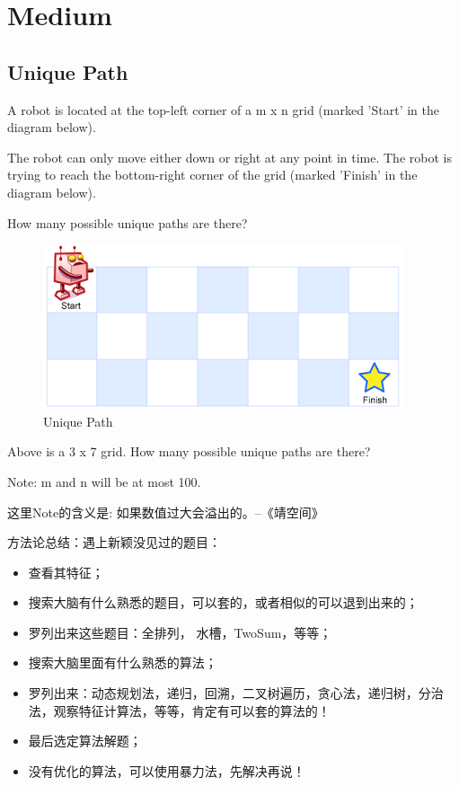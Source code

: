 \documentclass[12pt]{book}
\begin{document}
\section{Medium}
\label{sec-14-2}
\subsection{Unique Path}
\label{sec-14-2-1}
A robot is located at the top-left corner of a m x n grid (marked 'Start' in the diagram below).

The robot can only move either down or right at any point in time. The robot is trying to reach the bottom-right corner of the grid (marked 'Finish' in the diagram below).

How many possible unique paths are there?
\begin{figure}[htb]
\centering
\includegraphics[width=.9\linewidth]{./pic/uniquePaths.png}
\caption{Unique Path}
\end{figure}

Above is a 3 x 7 grid. How many possible unique paths are there?

Note: m and n will be at most 100.

这里Note的含义是: 如果数值过大会溢出的。--《靖空间》

方法论总结：遇上新颖没见过的题目：
\begin{itemize}
\item 查看其特征；
\item 搜索大脑有什么熟悉的题目，可以套的，或者相似的可以退到出来的；
\item 罗列出来这些题目：全排列， 水槽，TwoSum，等等；
\item 搜索大脑里面有什么熟悉的算法；
\item 罗列出来：动态规划法，递归，回溯，二叉树遍历，贪心法，递归树，分治法，观察特征计算法，等等，肯定有可以套的算法的！
\item 最后选定算法解题；
\item 没有优化的算法，可以使用暴力法，先解决再说！
\end{itemize}
\end{document}
